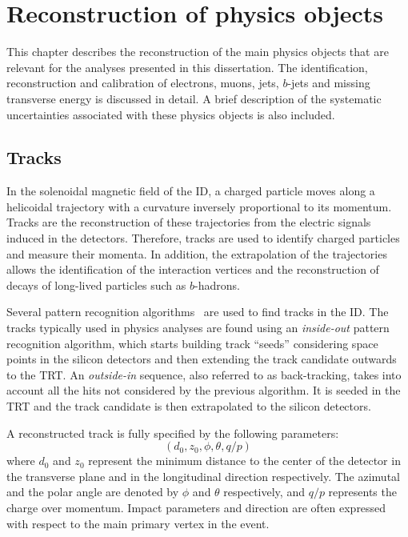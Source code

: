 \chapter{Reconstruction of physics objects}
    \label{chapter:ReconstructionOfObjects}

This chapter describes the reconstruction of the main physics objects that are relevant for the analyses presented in this dissertation.
The identification, reconstruction and calibration of electrons, muons, jets, $b$-jets and missing transverse energy is discussed in detail.
A brief description of the systematic uncertainties associated with these physics objects is also included.

\section{Tracks}
In the solenoidal magnetic field of the ID,
a charged particle moves along a helicoidal trajectory with
a curvature inversely proportional to its momentum. 
Tracks are the reconstruction of these trajectories from the 
electric signals induced in the detectors.
Therefore, tracks are used to identify charged particles and 
measure their momenta. 
In addition, the extrapolation of the trajectories allows
the identification of the interaction vertices and the reconstruction of decays of long-lived particles such as $b$-hadrons.

Several pattern recognition algorithms~\cite{Cornelissen:1020106} are used to find tracks in the ID.
The tracks typically used in physics analyses are found using an \textit{inside-out} pattern recognition algorithm, which starts building track ``seeds'' considering space points in the silicon detectors and then extending the track candidate 
outwards to the TRT. An \textit{outside-in} sequence, also referred to as back-tracking, takes into account all the hits not considered by the previous algorithm. It is seeded in the TRT and the track candidate is then extrapolated to the silicon detectors.

A reconstructed track is fully specified by the following parameters:
\begin{equation}
( d_0 , z_0 , \phi , \theta , q/p) 
\end{equation}
where $d_0$ and $z_0$ represent the minimum distance to the center of the detector in the transverse plane and in the longitudinal direction respectively. The azimutal and the polar angle are denoted by $\phi$ and $\theta$ respectively, and $q/p$ represents the charge over momentum. Impact parameters and direction are often expressed with respect to the main primary vertex in the event.

